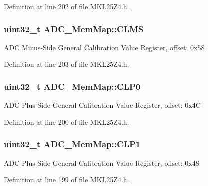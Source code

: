 Definition at line 202 of file M\+K\+L25\+Z4.\+h.

\subsubsection[{\texorpdfstring{C\+L\+MS}{CLMS}}]{\setlength{\rightskip}{0pt plus 5cm}uint32\+\_\+t A\+D\+C\+\_\+\+Mem\+Map\+::\+C\+L\+MS}\hypertarget{struct_a_d_c___mem_map_ad4519a320afe549d5b275b534be9bc39}{}\label{struct_a_d_c___mem_map_ad4519a320afe549d5b275b534be9bc39}
A\+DC Minus-\/\+Side General Calibration Value Register, offset\+: 0x58 

Definition at line 203 of file M\+K\+L25\+Z4.\+h.

\subsubsection[{\texorpdfstring{C\+L\+P0}{CLP0}}]{\setlength{\rightskip}{0pt plus 5cm}uint32\+\_\+t A\+D\+C\+\_\+\+Mem\+Map\+::\+C\+L\+P0}\hypertarget{struct_a_d_c___mem_map_a936082703bd7b18447b8edeeaa3c0c4f}{}\label{struct_a_d_c___mem_map_a936082703bd7b18447b8edeeaa3c0c4f}
A\+DC Plus-\/\+Side General Calibration Value Register, offset\+: 0x4C 

Definition at line 200 of file M\+K\+L25\+Z4.\+h.

\subsubsection[{\texorpdfstring{C\+L\+P1}{CLP1}}]{\setlength{\rightskip}{0pt plus 5cm}uint32\+\_\+t A\+D\+C\+\_\+\+Mem\+Map\+::\+C\+L\+P1}\hypertarget{struct_a_d_c___mem_map_ae99b44e06b93a2b62451162abe0aae92}{}\label{struct_a_d_c___mem_map_ae99b44e06b93a2b62451162abe0aae92}
A\+DC Plus-\/\+Side General Calibration Value Register, offset\+: 0x48 

Definition at line 199 of file M\+K\+L25\+Z4.\+h.

